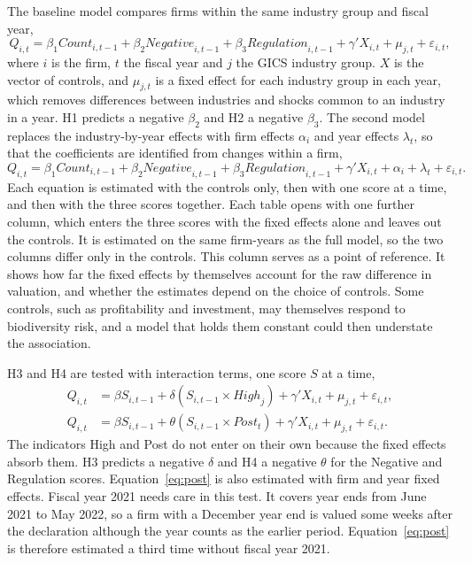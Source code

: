 \documentclass[12pt,a4paper]{article}
\begin{document}
The baseline model compares firms within the same industry group and fiscal year,
\begin{equation}
Q_{i,t} = \beta_1 \mathit{Count}_{i,t-1} + \beta_2 \mathit{Negative}_{i,t-1} + \beta_3 \mathit{Regulation}_{i,t-1} + \gamma' X_{i,t} + \mu_{j,t} + \varepsilon_{i,t},
\label{eq:baseline}
\end{equation}
where $i$ is the firm, $t$ the fiscal year and $j$ the GICS industry group. $X$ is the vector of controls, and $\mu_{j,t}$ is a fixed effect for each industry group in each year, which removes differences between industries and shocks common to an industry in a year. H1 predicts a negative $\beta_2$ and H2 a negative $\beta_3$. The second model replaces the industry-by-year effects with firm effects $\alpha_i$ and year effects $\lambda_t$, so that the coefficients are identified from changes within a firm,
\begin{equation}
Q_{i,t} = \beta_1 \mathit{Count}_{i,t-1} + \beta_2 \mathit{Negative}_{i,t-1} + \beta_3 \mathit{Regulation}_{i,t-1} + \gamma' X_{i,t} + \alpha_i + \lambda_t + \varepsilon_{i,t}.
\label{eq:firm}
\end{equation}
Each equation is estimated with the controls only, then with one score at a time, and then with the three scores together. Each table opens with one further column, which enters the three scores with the fixed effects alone and leaves out the controls. It is estimated on the same firm-years as the full model, so the two columns differ only in the controls. This column serves as a point of reference. It shows how far the fixed effects by themselves account for the raw difference in valuation, and whether the estimates depend on the choice of controls. Some controls, such as profitability and investment, may themselves respond to biodiversity risk, and a model that holds them constant could then understate the association.

H3 and H4 are tested with interaction terms, one score $S$ at a time,
\begin{align}
Q_{i,t} &= \beta S_{i,t-1} + \delta \left( S_{i,t-1} \times \mathit{High}_{j} \right) + \gamma' X_{i,t} + \mu_{j,t} + \varepsilon_{i,t}, \label{eq:high}\\
Q_{i,t} &= \beta S_{i,t-1} + \theta \left( S_{i,t-1} \times \mathit{Post}_{t} \right) + \gamma' X_{i,t} + \mu_{j,t} + \varepsilon_{i,t}. \label{eq:post}
\end{align}
The indicators High and Post do not enter on their own because the fixed effects absorb them. H3 predicts a negative $\delta$ and H4 a negative $\theta$ for the Negative and Regulation scores. Equation~\eqref{eq:post} is also estimated with firm and year fixed effects. Fiscal year 2021 needs care in this test. It covers year ends from June 2021 to May 2022, so a firm with a December year end is valued some weeks after the declaration although the year counts as the earlier period. Equation~\eqref{eq:post} is therefore estimated a third time without fiscal year 2021.
\end{document}
